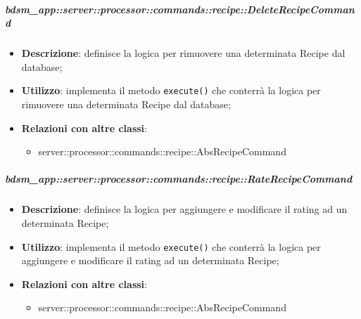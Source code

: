         \subparagraph{bdsm\_app::server::processor::commands::recipe::DeleteRecipeCommand} %
        \label{subp:bdsm_app_server_processor_commands_recipe_deleterecipecommand}
        \begin{itemize}
          \item \textbf{Descrizione}: definisce la logica per rimuovere una determinata Recipe dal database;
          \item \textbf{Utilizzo}: implementa il metodo \texttt{execute()} che conterrà la logica per rimuovere una determinata Recipe dal database;
          \item \textbf{Relazioni con altre classi}:
            \begin{itemize}
              \item server::processor::commands::recipe::AbsRecipeCommand
            \end{itemize}
        \end{itemize}

        \subparagraph{bdsm\_app::server::processor::commands::recipe::RateRecipeCommand} %
        \label{subp:bdsm_app_server_processor_commands_recipe_raterecipecommand}
        \begin{itemize}
          \item \textbf{Descrizione}: definisce la logica per aggiungere e modificare il rating ad un determinata Recipe;
          \item \textbf{Utilizzo}: implementa il metodo \texttt{execute()} che conterrà la logica per aggiungere e modificare il rating ad un determinata Recipe;
          \item \textbf{Relazioni con altre classi}:
            \begin{itemize}
              \item server::processor::commands::recipe::AbsRecipeCommand
            \end{itemize}
        \end{itemize}


